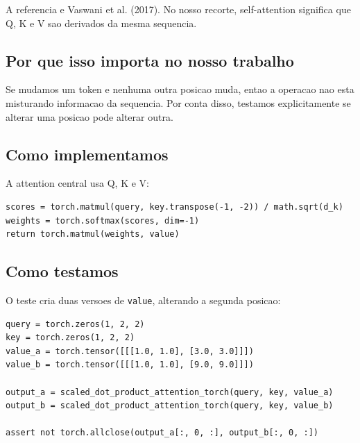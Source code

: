 A referencia e Vaswani et al. (2017). No nosso recorte, self-attention significa que Q, K e V sao derivados da mesma sequencia.



\subsection{Por que isso importa no nosso trabalho}





Se mudamos um token e nenhuma outra posicao muda, entao a operacao nao esta misturando informacao da sequencia. Por conta disso, testamos explicitamente se alterar uma posicao pode alterar outra.



\subsection{Como implementamos}



A attention central usa Q, K e V:



\begin{Verbatim}[fontsize=\small,breaklines=true,label=python]
scores = torch.matmul(query, key.transpose(-1, -2)) / math.sqrt(d_k)
weights = torch.softmax(scores, dim=-1)
return torch.matmul(weights, value)
\end{Verbatim}



\subsection{Como testamos}



O teste cria duas versoes de \texttt{value}, alterando a segunda posicao:



\begin{Verbatim}[fontsize=\small,breaklines=true,label=python]
query = torch.zeros(1, 2, 2)
key = torch.zeros(1, 2, 2)
value_a = torch.tensor([[[1.0, 1.0], [3.0, 3.0]]])
value_b = torch.tensor([[[1.0, 1.0], [9.0, 9.0]]])

output_a = scaled_dot_product_attention_torch(query, key, value_a)
output_b = scaled_dot_product_attention_torch(query, key, value_b)

assert not torch.allclose(output_a[:, 0, :], output_b[:, 0, :])
\end{Verbatim}



